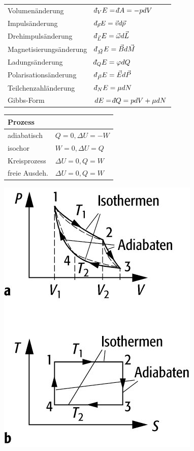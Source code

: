 \documentclass[12pt,a4paper]{article}
\renewcommand{\=}[1]{\stackrel{#1}{=}}
\def\dbar{{\mathchar'26\mkern-12mu d}}
\def\dbar{{\mathchar'26\mkern-12mu d}}
\theoremstyle{definition}
\theoremstyle{remark}
\begin{document}
\begin{center}
\begin{minipage}[t]{.5\linewidth}
\vspace{0pt}
\begin{tabular}{ll}
Volumenänderung & $\dbar_V E = \dbar A = - p dV$\\
Impulsänderung & $\dbar_{\vec p}E = \vec v d\vec p$\\
Drehimpulsänderung & $\dbar_{\vec L}E = \vec \omega d\vec L$\\
Magnetisierungsänderung & $\dbar_{\vec M}E = \vec B d\vec M$\\
Ladungsänderung & $\dbar_Q E = \varphi dQ$\\
Polarisationsänderung & $\dbar_{\vec P}E = \vec E d\vec P$\\
Teilchenzahländerung & $\dbar_N E = \mu dN$\\
Gibbs-Form & $dE = \dbar Q = p dV + \mu dN$\\
\end{tabular}
\begin{tabular}{ll}
\toprule
Prozess & \\
\midrule
adiabatisch & $Q = 0, \Delta U = -W$ \\
isochor & $W = 0, \Delta U = Q$ \\
Kreisprozess & $\Delta U = 0, Q = W$ \\
freie Ausdeh. & $\Delta U = 0, Q = W$ \\
\bottomrule
\end{tabular}
\end{minipage}%
\begin{minipage}[t]{.5\linewidth}
\vspace{0pt}
\centering
\includegraphics[width=0.7\linewidth]{pic/kreisprozess.jpg}
\end{minipage}
\end{center}
\end{document}
